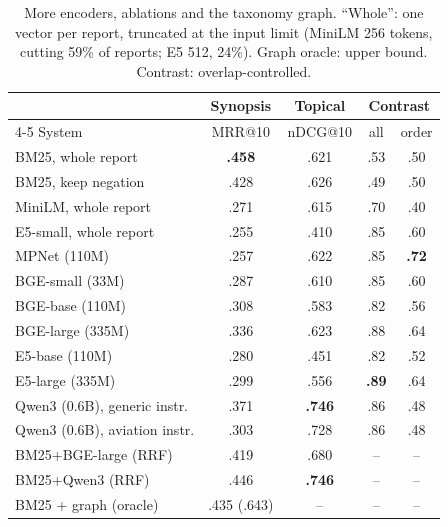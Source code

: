 \documentclass[conference]{IEEEtran}
\begin{document}
\begin{table}[t]
\centering
\caption{More encoders, ablations and the taxonomy graph. ``Whole'': one vector per
report, truncated at the input limit (MiniLM 256 tokens, cutting 59\% of reports; E5 512,
24\%). Graph oracle: upper bound. Contrast: overlap-controlled.}
\label{tab:ext}
\setlength{\tabcolsep}{3pt}
\begin{tabular}{@{}lcccc@{}}
\toprule
 & Synopsis & Topical & \multicolumn{2}{c}{Contrast}\\
\cmidrule(l){4-5}
System & MRR@10 & nDCG@10 & all & order\\
\midrule
BM25, whole report & \textbf{.458} & .621 & .53 & .50\\
BM25, keep negation      & .428 & .626 & .49 & .50\\
MiniLM, whole report & .271 & .615 & .70 & .40\\
E5-small, whole report & .255 & .410 & .85 & .60\\
\midrule
MPNet (110M)             & .257 & .622 & .85 & \textbf{.72}\\
BGE-small (33M)          & .287 & .610 & .85 & .60\\
BGE-base (110M)          & .308 & .583 & .82 & .56\\
BGE-large (335M)         & .336 & .623 & .88 & .64\\
E5-base (110M)           & .280 & .451 & .82 & .52\\
E5-large (335M)          & .299 & .556 & \textbf{.89} & .64\\
Qwen3 (0.6B), generic instr.  & .371 & \textbf{.746} & .86 & .48\\
Qwen3 (0.6B), aviation instr. & .303 & .728 & .86 & .48\\
\midrule
BM25+BGE-large (RRF)     & .419 & .680 & -- & --\\
BM25+Qwen3 (RRF)         & .446 & \textbf{.746} & -- & --\\
BM25 + graph (oracle)    & .435 (.643) & -- & -- & --\\
\bottomrule
\end{tabular}
\end{table}
\end{document}
